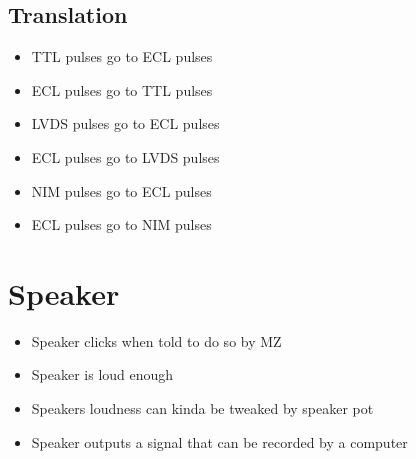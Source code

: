 \documentclass[11pt,a4paper]{article}
\begin{document}
\subsection{Translation}
\begin{itemize}
\item TTL pulses go to ECL pulses
\item ECL pulses go to TTL pulses
\item LVDS pulses go to ECL pulses
\item ECL pulses go to LVDS pulses
\item NIM pulses go to ECL pulses
\item ECL pulses go to NIM pulses
\end{itemize}
\section{Speaker}
\begin{itemize}
\item Speaker clicks when told to do so by MZ
\item Speaker is loud enough
\item Speakers loudness can kinda be tweaked by speaker pot
\item Speaker outputs a signal that can be recorded by a computer
\end{itemize}
\end{document}
